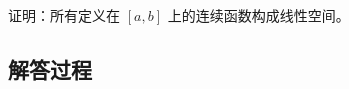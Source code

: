 \begin{example}[连续函数空间证明]
    证明：所有定义在 \([a, b]\) 上的连续函数构成线性空间。
    \end{example}
    
    \subsection*{解答过程}
    